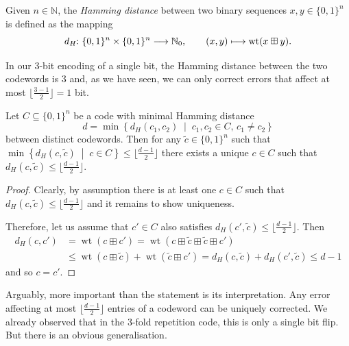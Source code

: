 \documentclass[a4paper, oneside, 12pt]{amsart}
\begin{document}
\begin{definition}\label{def:Hamming-distance}
  Given \(n \in \mathbb{N}\), the \emph{Hamming distance} between two binary sequences \(x, y \in \{0,1\}^n\) is defined as the mapping
  \begin{equation*}
    d_{H} \from \{0,1\}^{n} \times \{0,1\}^{n} \to \mathbb{N}_{0}, \qquad (x,y) \mapsto \operatorname{wt}(x \boxplus y).
  \end{equation*}
\end{definition}

In our \(3\)-bit encoding of a single bit, the Hamming distance between the two codewords is \(3\) and, as we have seen, we can only correct errors that affect at most \(\lfloor \frac{3-1}{2} \rfloor = 1\) bit.

\begin{proposition}\label{prop:error-correction-capabilities}
  Let \(C \subseteq \{0,1\}^{n}\) be a code with minimal Hamming distance
  \begin{equation*}
    d = \min \left\{ d_H(c_1, c_2) \;\middle|\; c_1, c_2 \in C, \, c_1 \neq c_2 \right\}
  \end{equation*}
  between distinct codewords.
  Then for any \(\tilde{c} \in\{0,1\}^{n}\) such that \(\min \left\{ d_H(c, \tilde{c}) \;\middle|\; c \in C \right\} \leq \lfloor\frac{d-1}{2}\rfloor\) there exists a unique \(c\in C\) such that
  \(d_H(c, \tilde{c}) \leq \lfloor\frac{d-1}{2}\rfloor \).
\end{proposition}
\begin{proof}
  Clearly, by assumption there is at least one \(c\in C\) such that \(d_{H}(c, \tilde{c}) \leq \lfloor\frac{d-1}{2}\rfloor\) and it remains to show uniqueness.

  Therefore, let us assume that \(c' \in C\) also satisfies \(d_{H}(c', \tilde{c}) \leq \lfloor\frac{d-1}{2}\rfloor\).
  Then
  \begin{align*}
    d_{H}(c,c')
    & = \operatorname{wt}(c \boxplus c')
      = \operatorname{wt}(c \boxplus \tilde{c} \boxplus \tilde{c} \boxplus c')\\
    & \leq \operatorname{wt}(c \boxplus \tilde{c}) + \operatorname{wt}(\tilde{c} \boxplus c')
      = d_{H}(c, \tilde{c}) + d_{H}(c', \tilde{c}) \leq d-1
  \end{align*}
  and so \(c = c'\).
\end{proof}
Arguably, more important than the statement is its interpretation.
Any error affecting at most \(\lfloor\frac{d-1}{2}\rfloor\) entries of a codeword can be uniquely corrected.
We already observed that in the 3-fold repetition code, this is only a single bit flip.
But there is an obvious generalisation.
\end{document}
